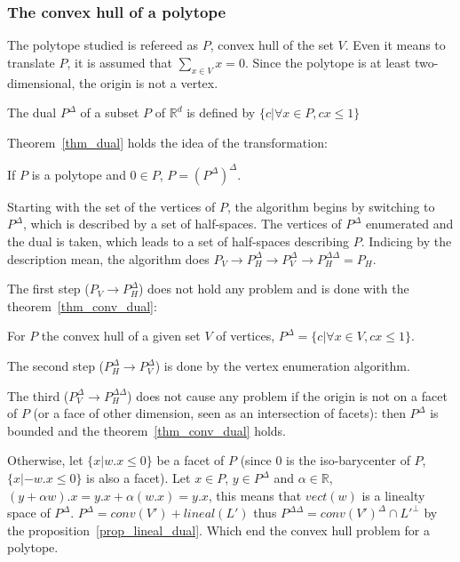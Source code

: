 \subsubsection{The convex hull of a polytope}
The polytope studied is refereed as $P$, convex hull of the set $V$. Even it means to translate $P$, it is assumed that $\sum_{x\in V} x = 0 $. Since the polytope is at least two-dimensional, the origin is not a vertex. 

\begin{definition}
The dual $P^\Delta$ of a subset $P$ of $\mathbb{R}^d$ is defined by $\{c | \forall x \in P, cx\leq 1  \}$
\end{definition}

Theorem~\ref{thm_dual} holds the idea of the transformation:

\begin{theorem}
If $P$ is a polytope and $0\in P$, $P=(P^\Delta)^\Delta$.
\label{thm_dual}
\end{theorem}

Starting with the set of the vertices of $P$, the algorithm begins by switching to $P^\Delta$, which is described by a set of half-spaces. The vertices of $P^\Delta$ enumerated and the dual is taken, which leads to a set of half-spaces describing $P$. Indicing by the description mean, the algorithm does $ P_V \rightarrow P_H^\Delta \rightarrow P_V^\Delta \rightarrow P_H^{\Delta\Delta} = P_H $. 

The first step ($P_V \rightarrow P_H^\Delta$) does not hold any problem and is done with the theorem~\ref{thm_conv_dual}:
\begin{theorem}
For $P$ the convex hull of a given set $V$ of vertices, $P^\Delta=\{c | \forall x \in V, cx\leq 1\}$.
\label{thm_conv_dual}
\end{theorem}
The second step ($P_H^\Delta \rightarrow P_V^\Delta$) is done by the vertex enumeration algorithm. 

The third ($P_V^\Delta \rightarrow P_H^{\Delta\Delta}$) does not cause any problem if the origin is not on a facet of $P$ (or a face of other dimension, seen as an intersection of facets): then $P^\Delta$ is bounded and the theorem~\ref{thm_conv_dual} holds.

Otherwise, let $\{x|w.x \leq 0\}$ be a facet of $P$ (since $0$ is the iso-barycenter of $P$, $\{x| -w.x \leq 0\}$ is also a facet). Let $x\in P$, $y\in P^\Delta$ and $\alpha\in\mathbb{R}$, $(y+\alpha w).x=y.x+\alpha(w.x)=y.x$, this means that $vect(w)$ is a linealty space of $P^\Delta$. $P^\Delta=conv(V')+lineal(L')$ thus $P^{\Delta\Delta}=conv(V')^\Delta \cap L'^\bot$ by the proposition~\ref{prop_lineal_dual}. Which end the convex hull problem for a polytope.


